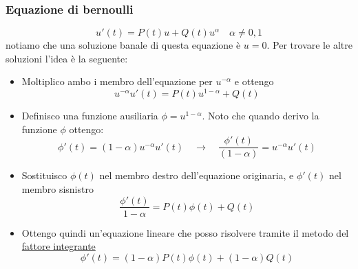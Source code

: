 \subsubsection*{Equazione di bernoulli}
\[
	u'\left( t \right) = P\left( t \right) u + Q\left( t \right) u^{\alpha} \quad \alpha  \neq 0 , 1
\]
notiamo che una soluzione banale di questa equazione è $ u=0 $. Per trovare le altre soluzioni l'idea è la seguente:
\begin{itemize}
	\item Moltiplico ambo i membro dell'equazione per $ u^{- \alpha } $ e ottengo
	      \[
		      u^{-\alpha } u'\left( t \right) = P\left( t \right) u^{1-\alpha } + Q\left( t \right)
	      \]
	\item Definisco una funzione ausiliaria $ \phi =u ^{1-\alpha } $. Noto che quando derivo la funzione $ \phi  $ ottengo:
	      \[
		      \phi ' \left( t \right) = \left( 1-\alpha  \right) u^{-\alpha }u'\left( t \right)  \quad  \rightarrow \quad \frac{\phi '\left( t \right)}{\left( 1-\alpha  \right) } = u^{-\alpha  }u'\left( t \right)
	      \]
	\item Sostituisco $ \phi \left( t \right)  $ nel membro destro dell'equazione originaria, e $ \phi ' \left( t \right)  $ nel membro sisnistro
	      \[
		      \frac{\phi '\left( t \right) }{1-\alpha }=P\left( t \right) \phi \left( t \right) + Q\left( t \right)
	      \]
	\item Ottengo quindi un'equazione lineare che posso risolvere tramite il metodo del \underline{fattore integrante}
	      \[
		      \phi '\left( t \right) =  \left( 1-\alpha  \right)  P\left( t \right) \phi \left( t \right) + \left( 1-\alpha  \right) Q\left( t \right)
	      \]
\end{itemize}
